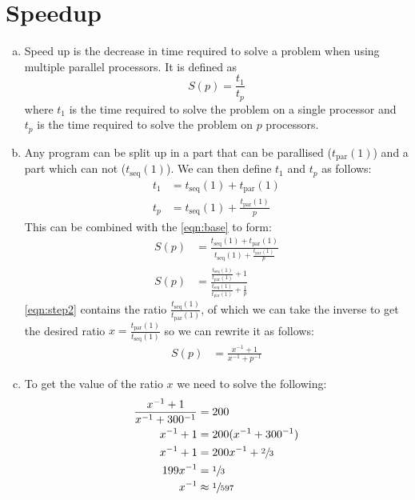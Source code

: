 \documentclass[a4paper]{article}
\begin{document}
\section{Speedup}
\begin{enumerate}[(a)]
	\item Speed up is the decrease in time required to solve a problem when using multiple parallel processors. It is defined as
		\begin{equation}
			S(p) = \frac{t_1}{t_p} \label{eqn:base}
		\end{equation}
		where $t_1$ is the time required to solve the problem on a single processor and $t_p$ is the time required to solve the problem on $p$ processors.
	\item Any program can be split up in a part that can be parallised ($t_\text{par}(1)$) and a part which can not ($t_\text{seq}(1)$). We can then define $t_1$ and $t_p$ as follows:
		\begin{align*}
			t_1 &= t_\text{seq}(1) + t_\text{par}(1) \\
			t_p &= t_\text{seq}(1) + \frac{t_\text{par}(1)}{p}
		\end{align*}
		This can be combined with the \autoref{eqn:base} to form:
		\begin{align}
			S(p) &= \frac{t_\text{seq}(1) + t_\text{par}(1)}{t_\text{seq}(1) + \frac{t_\text{par}(1)}{p}} \nonumber \\
			S(p) &= \frac{\frac{t_\text{seq}(1)}{t_\text{par}(1)} + 1}{\frac{t_\text{seq}(1)}{t_\text{par}(1)} + \frac{1}{p}} \label{eqn:step2}
		\end{align}
		\autoref{eqn:step2} contains the ratio $\displaystyle \frac{t_\text{seq}(1)}{t_\text{par}(1)}$, of which we can take the inverse to get the desired ratio $\displaystyle x = \frac{t_\text{par}(1)}{t_\text{seq}(1)}$ so we can rewrite it as follows:
		\begin{align*}
			S(p) &= \frac{x^{-1} + 1}{x^{-1} + p^{-1}}
		\end{align*}
	\item To get the value of the ratio $x$ we need to solve the following:
		\begin{align*}
			\frac{x^{-1} + 1}{x^{-1} + 300^{-1}} &= 200 \\
			x^{-1} + 1 & = 200 (x^{-1} + 300^{-1}) \\
			x^{-1} + 1 &= 200 x^{-1} + \sfrac{2}{3} \\
			199 x^{-1} &= \sfrac{1}{3} \\
			x^{-1} &\approx \sfrac{1}{597} \\

\end{align*}
\end{enumerate}
\end{document}

